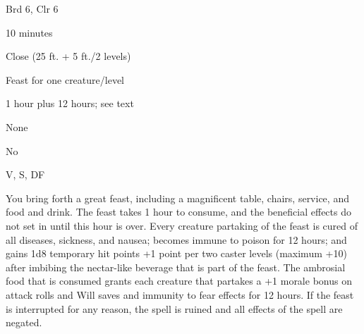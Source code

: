 
\begin{description*}
\item[Level:] Brd 6, Clr 6
\item[Casting Time:] 10 minutes
\item[Range:] Close (25 ft. + 5 ft./2 levels)
\item[Effect:] Feast for one creature/level
\item[Duration:] 1 hour plus 12 hours; see text
\item[Saving Throw:] None
\item[Spell Resistance:] No
\item[Components:] V, S, DF
\end{description*}

You bring forth a great feast, including a magnificent table, chairs, service,
and food and drink. The feast takes 1 hour to consume, and the beneficial effects
do not set in until this hour is over. Every creature partaking of the feast is
cured of all diseases, sickness, and nausea; becomes immune to poison for 12 hours;
and gains 1d8 temporary hit points +1 point per two caster levels (maximum +10)
after imbibing the nectar-like beverage that is part of the feast. The ambrosial
food that is consumed grants each creature that partakes a +1 morale bonus on attack
rolls and Will saves and immunity to fear effects for 12 hours.
If the feast is interrupted for any reason, the spell is ruined and all effects
of the spell are negated.